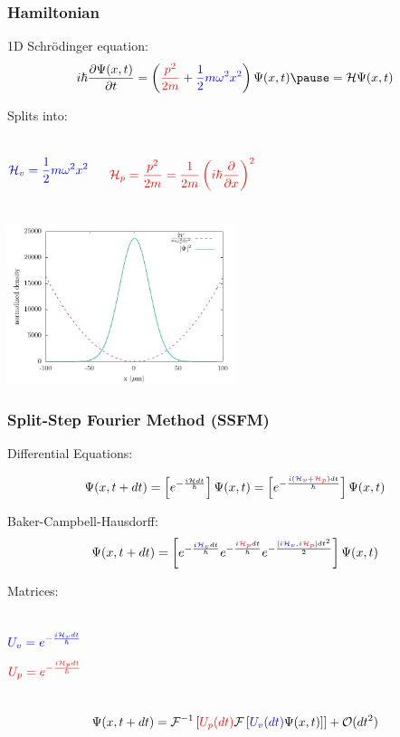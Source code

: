 \documentclass{beamer}
\begin{document}
\begin{frame}
\frametitle{Hamiltonian}
1D Schr\"odinger equation:
\begin{equation*}
i\hbar \frac{\partial \Psi(x, t)}{\partial t} = \left({\color{red}{\frac{ p^2}{2m}}} + {\color{blue}{\frac{1}{2}m\omega^2x^2}} \right)\Psi(x,t) \pause = \mathcal{H} \Psi(x,t)
\end{equation*}

Splits into:
\begin{columns}
$$
\color{blue}{\mathcal{H}_v = \frac{1}{2}m\omega^2x^2}
$$

\vspace{-0.8cm}
$$
\color{red}{\mathcal{ H}_p = \frac{p^2}{2m} = \frac{1}{2m}\left(i\hbar \frac{\partial}{\partial x}\right)^2}
$$
\end{columns}

\begin{center}
\includegraphics[width=0.5\textwidth]{../data/qs/SHO/SHO_2.pdf}
\end{center}
\end{frame}


\begin{frame}
\frametitle{Split-Step Fourier Method (SSFM)}

Differential Equations:

\begin{equation*}
\Psi(x,t + dt) = \left[e^{-\frac{i\mathcal{{H}}dt}{\hbar}}\right]\Psi(x,t) = \left[e^{-\frac{i({\color{blue}{\mathcal{{H}}_v}} + {\color{red}{\mathcal{{H}}_p}})dt}{\hbar}}\right]\Psi(x,t)
\end{equation*}

\pause
Baker-Campbell-Hausdorff:
\begin{equation*}
\Psi(x,t+dt) = \left[e^{-\frac{i{\color{blue}{\mathcal{{H}}_v}}dt}{\hbar}}e^{-\frac{i{\color{red}{\mathcal{{H}}_p}}dt}{\hbar}}e^{-\frac{[i{\color{blue}{\mathcal{{H}}_v}}, i{\color{red}{\mathcal{{H}}_p}}]dt^2}{2}}\right]\Psi(x,t)
\end{equation*}

Matrices:
\begin{columns}
$$
\color{blue}{{U}_v = e^{-\frac{i\mathcal{{H}}_vdt}{\hbar}}}
$$
$$
\color{red}{{U}_p = e^{-\frac{i\mathcal{{H}}_pdt}{\hbar}}}
$$
\end{columns}


\begin{equation*}
\Psi(x, t+dt) = \mathcal{F}^{-1}\left[{\color{red}{{U}_p(dt)}} \mathcal{F} \left[{\color{blue}{{U}_v(dt)}} \Psi(x,t) \right] \right] + \mathcal{O}(dt^2)
\end{equation*}

\end{frame}
\end{document}
